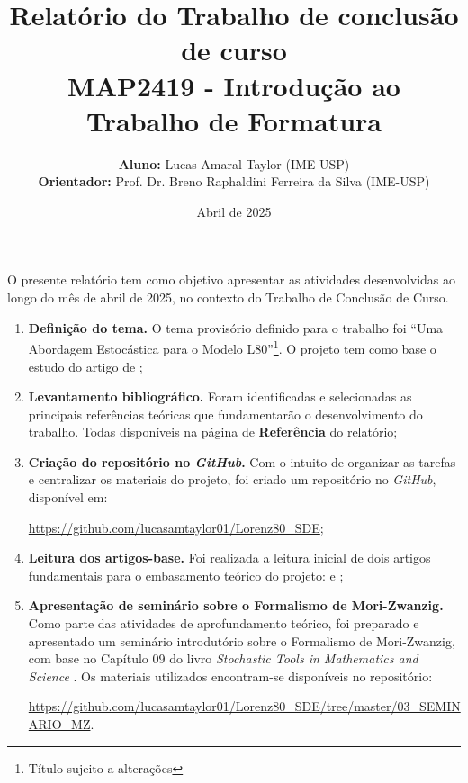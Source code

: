 \documentclass[12pt]{article}
\title{Relatório do Trabalho de conclusão de curso \\ \large{MAP2419 - Introdução ao Trabalho de Formatura}}
\date{Abril de 2025}
\author{
\textbf{Aluno:} Lucas Amaral Taylor (IME-USP)\\
\textbf{Orientador:} Prof. Dr. Breno Raphaldini Ferreira da Silva (IME-USP)
}
\begin{document}
\maketitle

O presente relatório tem como objetivo apresentar as atividades desenvolvidas ao longo do mês de abril de 2025, no contexto do Trabalho de Conclusão de Curso.

\begin{enumerate}
	\item \textbf{Definição do tema.} O tema provisório definido para o trabalho foi “Uma Abordagem Estocástica para o Modelo L80”\footnote{Título sujeito a alterações}. O projeto tem como base o estudo do artigo de \citet{Chekroun2021};
	      
	\item \textbf{Levantamento bibliográfico.} Foram identificadas e selecionadas as principais referências teóricas que fundamentarão o desenvolvimento do trabalho. Todas disponíveis na página de \textbf{Referência} do relatório;
	      
	\item \textbf{Criação do repositório no \textit{GitHub}.} Com o intuito de organizar as tarefas e centralizar os materiais do projeto, foi criado um repositório no \textit{GitHub}, disponível em:
	      
	   \textcolor{blue}{\href{https://github.com/lucasamtaylor01/Lorenz80_SDE}{https://github.com/lucasamtaylor01/Lorenz80\_SDE}};

	      
	\item \textbf{Leitura dos artigos-base.} Foi realizada a leitura inicial de dois artigos fundamentais para o embasamento teórico do projeto: \citet{Chekroun2017} e \citet{Chekroun2021};
	      
	\item \textbf{Apresentação de seminário sobre o Formalismo de Mori-Zwanzig.} Como parte das atividades de aprofundamento teórico, foi preparado e apresentado um seminário introdutório sobre o Formalismo de Mori-Zwanzig, com base no Capítulo 09 do livro \textit{Stochastic Tools in Mathematics and Science} \citep{Chorin2013}. Os materiais utilizados encontram-se disponíveis no repositório: 
	      
	   \textcolor{blue}{\href{https://github.com/lucasamtaylor01/Lorenz80_SDE/tree/master/03_SEMINARIO_MZ}{https://github.com/lucasamtaylor01/Lorenz80\_SDE/tree/master/03\_SEMINARIO\_MZ}}.

\end{enumerate}


\newpage
\nocite{*}
\printbibliography
\end{document}
